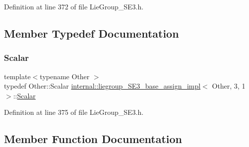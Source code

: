 Definition at line 372 of file Lie\+Group\+\_\+\+S\+E3.\+h.



\subsection{Member Typedef Documentation}
\hypertarget{structinternal_1_1liegroup___s_e3__base__assign__impl_3_01_other_00_013_00_011_01_4_aef78132c5f1f66237af2dcf4873a24d0}{}\label{structinternal_1_1liegroup___s_e3__base__assign__impl_3_01_other_00_013_00_011_01_4_aef78132c5f1f66237af2dcf4873a24d0} 
\subsubsection{\texorpdfstring{Scalar}{Scalar}}
{\footnotesize\ttfamily template$<$typename Other $>$ \\
typedef Other\+::\+Scalar \hyperlink{structinternal_1_1liegroup___s_e3__base__assign__impl}{internal\+::liegroup\+\_\+\+S\+E3\+\_\+base\+\_\+assign\+\_\+impl}$<$ Other, 3, 1 $>$\+::\hyperlink{structinternal_1_1liegroup___s_e3__base__assign__impl_3_01_other_00_013_00_011_01_4_aef78132c5f1f66237af2dcf4873a24d0}{Scalar}}



Definition at line 375 of file Lie\+Group\+\_\+\+S\+E3.\+h.



\subsection{Member Function Documentation}
\hypertarget{structinternal_1_1liegroup___s_e3__base__assign__impl_3_01_other_00_013_00_011_01_4_aac0ef6a07b1f6e3fe0f550c85edff934}{}\label{structinternal_1_1liegroup___s_e3__base__assign__impl_3_01_other_00_013_00_011_01_4_aac0ef6a07b1f6e3fe0f550c85edff934} 
